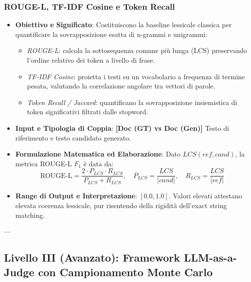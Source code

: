 \subsubsection{ROUGE-L, TF-IDF Cosine e Token Recall}
\label{subsubsec:rouge_tfidf}
\begin{itemize}[leftmargin=*, label=\textbullet]
    \item \textbf{Obiettivo e Significato}: Costituiscono la baseline lessicale classica per quantificare la sovrapposizione esatta di n-grammi e unigrammi:
    \begin{itemize}
        \item \emph{ROUGE-L}: calcola la sottosequenza comune più lunga (LCS) preservando l'ordine relativo dei token a livello di frase.
        \item \emph{TF-IDF Cosine}: proietta i testi su un vocabolario a frequenza di termine pesata, valutando la correlazione angolare tra vettori di parole.
        \item \emph{Token Recall / Jaccard}: quantificano la sovrapposizione insiemistica di token significativi filtrati dalle stopword.
    \end{itemize}
    \item \textbf{Input e Tipologia di Coppia}: \textbf{[Doc (GT) vs Doc (Gen)]} Testo di riferimento e testo candidato generato.
    \item \textbf{Formulazione Matematica ed Elaborazione}: Dato $LCS(ref, cand)$, la metrica ROUGE-L $F_1$ è data da:
    \begin{equation}
        \text{ROUGE-L} = \frac{2 \cdot P_{LCS} \cdot R_{LCS}}{P_{LCS} + R_{LCS}}, \quad P_{LCS} = \frac{LCS}{|cand|}, \quad R_{LCS} = \frac{LCS}{|ref|}
        \label{eq:rouge_l}
    \end{equation}
    \item \textbf{Range di Output e Interpretazione}: $[0.0, 1.0]$. Valori elevati attestano elevata coerenza lessicale, pur risentendo della rigidità dell'exact string matching.
\end{itemize}

---

\subsection{Livello III (Avanzato): Framework LLM-as-a-Judge con Campionamento Monte Carlo}


